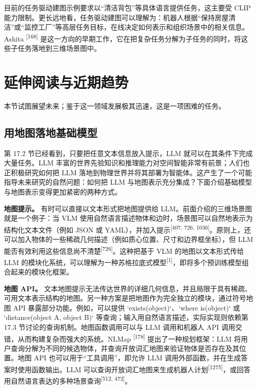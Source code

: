目前的任务驱动建图示例要求以“清洁背包”等具体语言提供任务，这主要受 CLIP 能力限制。更长远地看，任务驱动建图可以理解为：机器人根据“保持房屋清洁”或“监控工厂”等高层任务目标，在线决定如何表示和组织场景中的相关信息。Ashita \textsuperscript{[168]} 是这一方向的早期工作，它在把复杂任务分解为子任务的同时，将这些子任务落地到三维场景图中。

\section{延伸阅读与近期趋势}

本节试图展望未来；鉴于这一领域发展极其迅速，这是一项困难的任务。

\subsection{用地图落地基础模型}

第 17.2 节已经看到，只要把任意文本信息放入提示，LLM 就可以在其条件下完成大量任务。LLM 丰富的世界先验知识和推理能力对空间智能非常有前景；人们也正积极研究如何把 LLM 落地到物理世界并将其部署为智能体。这产生了一个可能指导未来研究的自然问题：如何把 LLM 与地图表示充分集成？下面介绍基础模型与地图表示变得更加紧密的两种方式。

\textbf{地图提示。} 有时可以直接以文本形式把地图提供给 LLM。前面介绍的三维场景图就是一个例子：当 VLM 使用自然语言描述物体和边时，场景图可以自然地表示为结构化文本文件（例如 JSON 或 YAML），并加入提示\textsuperscript{[407, 726, 1036]}。原则上，还可以加入物体的一些稀疏几何描述（例如质心位置、尺寸和边界框坐标），但 LLM 能否有效利用这些信息尚不清楚\textsuperscript{[726]}。这种把基于 VLM 的地图以文本形式传给 LLM 的模块化系统，可以理解为一种苏格拉底式模型\textsuperscript{[1]}，即将多个预训练模型组合起来的模块化框架。

\textbf{地图 API。} 文本地图提示无法传达世界的详细几何信息，并且局限于具有稀疏、可用文本表示结构的地图。另一种方案是把地图作为完全独立的模块，通过符号地图 API 暴露部分功能。例如，可以提供 `exists(object)`、`where is(object)` 或 `distance(object A, object B)` 等查询；输入用自然语言描述，实际实现则依赖第 17.3 节讨论的查询机制。地图函数调用可以与 LLM 调用和机器人 API 调用交错，从而构建复杂而强大的系统。NLMap \textsuperscript{[178]} 提出了一种规划框架：LLM 将用户查询分解为不同的候选物体，并查询开放词汇地图来验证物体是否存在及其位置。地图 API 也可以用于“工具调用”，即允许 LLM 调用外部函数，并在生成答案时使用函数输出。LLM 可以查询开放词汇地图来生成机器人计划\textsuperscript{[1275]}，或回答用自然语言表达的多种场景查询\textsuperscript{[512, 472]}。

